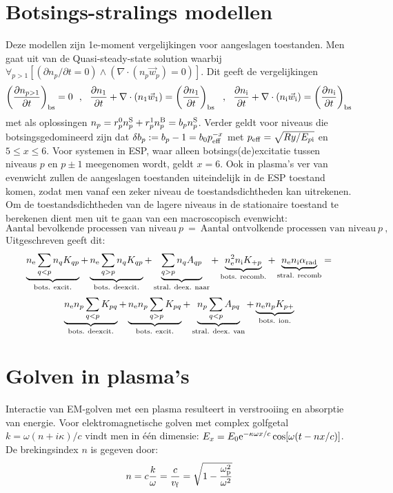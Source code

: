 \documentclass[twoside]{report}
\begin{document}
\section{Botsings-stralings modellen}
Deze modellen zijn 1e-moment vergelijkingen voor aangeslagen toestanden. Men
gaat uit van de Quasi-steady-state solution waarbij
$\forall_{p>1}[(\partial n_p/\partial t=0)\wedge(\nabla\cdot(n_p\vec{w}_p)=0)]$.
Dit geeft de vergelijkingen
\[
\Qc{n_{p>1}}{t}{\rm bs}=0~~,~~
\Q{n_1}{t}+\nabla\cdot(n_1\vec{w}_1)=\Qc{n_1}{t}{\rm bs}~~,~~
\Q{\ni}{t}+\nabla\cdot(\ni\vec{w}_{\rm i})=\Qc{n_{\rm i}}{t}{\rm bs}
\]
met als oplossingen $n_p=r_p^0n_p^{\rm S}+r_p^1n_p^{\rm B}=b_pn_p^{\rm S}$.
Verder geldt voor niveaus die botsingsgedomineerd zijn dat
$\delta b_p:=b_p-1=b_0p_{\rm eff}^{-x}$ met $p_{\rm eff}=\sqrt{Ry/E_{p{\rm i}}}$
en $5\leq x\leq6$. Voor systemen in ESP, waar alleen botsings(de)excitatie
tussen niveaus $p$ en $p\pm1$ meegenomen wordt, geldt $x=6$. Ook in plasma's
ver van evenwicht zullen de aangeslagen toestanden uiteindelijk in de ESP
toestand komen, zodat men vanaf een zeker niveau de toestandsdichtheden kan
uitrekenen.
\npar
Om de toestandsdichtheden van de lagere niveaus in de stationaire toestand te
berekenen dient men uit te gaan van een macroscopisch evenwicht:
\[
\mbox{Aantal bevolkende processen van niveau}~p~=~
\mbox{Aantal ontvolkende processen van niveau}~p~,
\]
Uitgeschreven geeft dit:
\[
\underbrace{\ne\sum_{q<p}n_qK_{qp}}_{\rm bots.~excit.}+
\underbrace{\ne\sum_{q>p}n_qK_{qp}}_{\rm bots.~deexcit.}+
\underbrace{\sum_{q>p}n_qA_{qp}}_{\rm stral.~deex.~naar}+
\underbrace{\ne^2\ni K_{+p}}_{\rm bots.~recomb.}+
\underbrace{\ne\ni\alpha_{\rm rad}}_{\rm stral.~recomb}=
\]
\[
\underbrace{\ne n_p\sum_{q<p}K_{pq}}_{\rm bots.~deexcit.}+
\underbrace{\ne n_p\sum_{q>p}K_{pq}}_{\rm bots.~excit.}+
\underbrace{n_p\sum_{q<p}A_{pq}}_{\rm stral.~deex.~van}+
\underbrace{\ne n_pK_{p+}}_{\rm bots.~ion.}
\]

\section{Golven in plasma's}
Interactie van EM-golven met een plasma resulteert in verstrooiing en
absorptie van energie. Voor elektromagnetische golven met complex golfgetal
$k=\omega(n+i\kappa)/c$ vindt men in \'e\'en dimensie:
$E_x=E_0{\rm e}^{-\kappa\omega x/c}\cos[\omega(t-nx/c)]$. De brekingsindex
$n$ is gegeven door:
\[
n=c\frac{k}{\omega}=\frac{c}{v_{\rm f}}=\sqrt{1-\frac{\omega_{\rm p}^2}{\omega^2}}
\]
\end{document}
